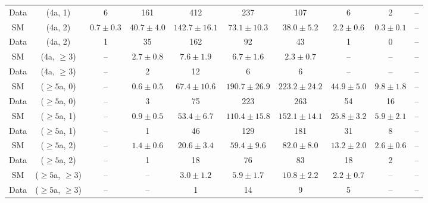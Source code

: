 \begin{table}[h!]
{\begin{tabular}{cccccccccc}
	Data & (4a, 1) & 6 & 161 & 412 & 237 & 107 & 6 & 2 & -- \\[0.5ex] 
	SM & (4a, 2) & $0.7\pm 0.3$ & $40.7\pm 4.0$ & $142.7\pm 16.1$ & $73.1\pm 10.3$ & $38.0\pm 5.2$ & $2.2\pm 0.6$ & $0.3\pm 0.1$ & -- \\[0.5ex] 
	Data & (4a, 2) & 1 & 35 & 162 & 92 & 43 & 1 & 0 & -- \\[0.5ex] 
	SM & (4a, $\ge3$) & -- & $2.7\pm 0.8$ & $7.6\pm 1.9$ & $6.7\pm 1.6$ & $2.3\pm 0.7$ & -- & -- & -- \\[0.5ex] 
	Data & (4a, $\ge3$) & -- & 2 & 12 & 6 & 6 & -- & -- & -- \\[0.5ex] 
	SM & ($\ge5$a, 0) & -- & $0.6\pm 0.5$ & $67.4\pm 10.6$ & $190.7\pm 26.9$ & $223.2\pm 24.2$ & $44.9\pm 5.0$ & $9.8\pm 1.8$ & -- \\[0.5ex] 
	Data & ($\ge5$a, 0) & -- & 3 & 75 & 223 & 263 & 54 & 16 & -- \\[0.5ex] 
	SM & ($\ge5$a, 1) & -- & $0.9\pm 0.5$ & $53.4\pm 6.7$ & $110.4\pm 15.8$ & $152.1\pm 14.1$ & $25.8\pm 3.2$ & $5.9\pm 2.1$ & -- \\[0.5ex] 
	Data & ($\ge5$a, 1) & -- & 1 & 46 & 129 & 181 & 31 & 8 & -- \\[0.5ex] 
	SM & ($\ge5$a, 2) & -- & $1.4\pm 0.6$ & $20.6\pm 3.4$ & $59.4\pm 9.6$ & $82.0\pm 8.0$ & $13.2\pm 2.0$ & $2.6\pm 0.6$ & -- \\[0.5ex] 
	Data & ($\ge5$a, 2) & -- & 1 & 18 & 76 & 83 & 18 & 2 & -- \\[0.5ex] 
	SM & ($\ge5$a, $\ge3$) & -- & -- & $3.0\pm 1.2$ & $5.9\pm 1.7$ & $10.8\pm 2.2$ & $2.2\pm 0.7$ & -- & -- \\[0.5ex] 
	Data & ($\ge5$a, $\ge3$) & -- & -- & 1 & 14 & 9 & 5 & -- & -- \\[0.5ex] 
	\hline
	\hline
\end{tabular}}
\end{table}

